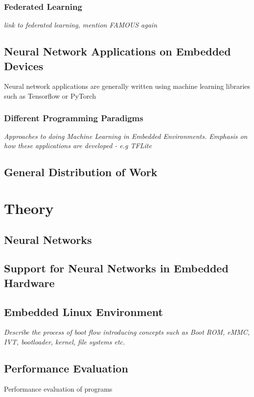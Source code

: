 \subsection{Federated Learning}

\textit{link to federated learning, mention FAMOUS again}

\section{Neural Network Applications on Embedded Devices}

Neural network applications are generally written using machine learning libraries such as Tensorflow or PyTorch

\subsection{Different Programming Paradigms}
\textit{Approaches to doing Machine Learning in Embedded Environments. Emphasis on how these applications are developed - e.g TFLite}

\section{General Distribution of Work}

\chapter{Theory}

\section{Neural Networks}

\section{Support for Neural Networks in Embedded Hardware}

\section{Embedded Linux Environment}
\textit{Describe the process of boot flow introducing concepts such as Boot ROM, eMMC, IVT, bootloader, kernel, file systems etc.}

\section{Performance Evaluation}

Performance evaluation of programs

